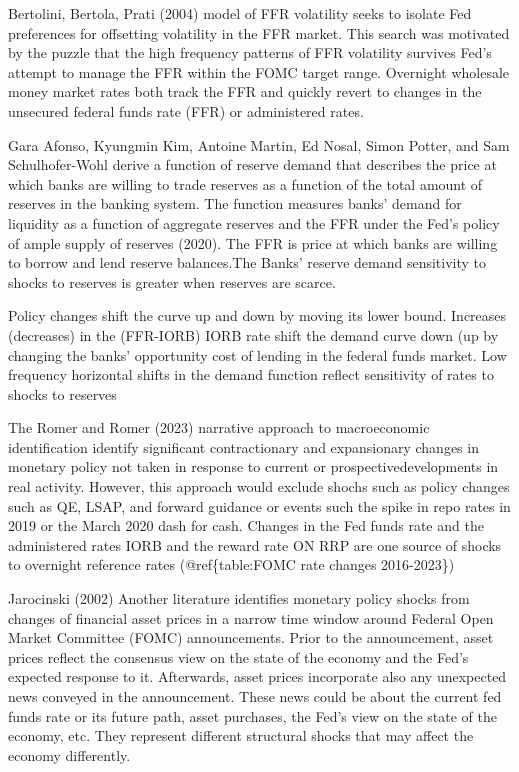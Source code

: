 \documentclass[
]{article}
\begin{document}
Bertolini, Bertola, Prati (2004) model of FFR volatility seeks to isolate Fed preferences for offsetting volatility in the FFR market. This search was motivated by the puzzle that the high frequency patterns of FFR volatility survives Fed's attempt to manage the FFR within the FOMC target range. Overnight wholesale money market rates both track the FFR and quickly revert to changes in the unsecured federal funds rate (FFR) or administered rates.

Gara Afonso, Kyungmin Kim, Antoine Martin, Ed Nosal, Simon Potter, and Sam Schulhofer-Wohl derive a function of reserve demand that describes the price at which banks are willing to trade reserves as a function of the total amount of reserves in the banking system. The function measures banks' demand for liquidity as a function of aggregate reserves and the FFR under the Fed's policy of ample supply of reserves (2020). The FFR is price at which banks are willing to borrow and lend reserve balances.The Banks' reserve demand sensitivity to shocks to reserves is greater when reserves are scarce.

Policy changes shift the curve up and down by moving its lower bound. Increases (decreases) in the (FFR-IORB) IORB rate shift the demand curve down (up by changing the banks' opportunity cost of lending in the federal funds market. Low frequency horizontal shifts in the demand function reflect sensitivity of rates to shocks to reserves

The Romer and Romer (2023) narrative approach to macroeconomic identification identify significant contractionary and expansionary changes in monetary policy not taken in response to current or prospectivedevelopments in real activity. However, this approach would exclude shochs such as policy changes such as QE, LSAP, and forward guidance or events such the spike in repo rates in 2019 or the March 2020 dash for cash. Changes in the Fed funds rate and the administered rates IORB and the reward rate ON RRP are one source of shocks to overnight reference rates (@ref\{table:FOMC rate changes 2016-2023\})

Jarocinski (2002)
Another literature identifies monetary policy shocks from changes of financial asset prices in a narrow time window around Federal Open Market Committee (FOMC) announcements. Prior to the announcement, asset prices reflect the consensus view on the state of the economy and the Fed's expected response to it. Afterwards, asset prices incorporate also any unexpected news conveyed in the announcement. These news could be about the current fed funds rate or its future path, asset purchases, the Fed's view on the state of the economy, etc. They represent different structural shocks that may affect the economy differently.
\end{document}
